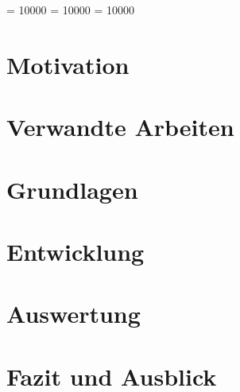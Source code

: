 \documentclass[12pt,a4paper,twosided,openany]{scrbook}
\begin{document}
\clubpenalty = 10000
\widowpenalty = 10000
\displaywidowpenalty = 10000

\mainmatter

\chapter{Motivation}
\label{cha:1_Motivation}

\chapter{Verwandte Arbeiten}

\chapter{Grundlagen}

\chapter{Entwicklung}
\label{cha:4_Entwicklung}

\chapter{Auswertung}

\chapter{Fazit und Ausblick}




\vfill
\pagebreak

\appendix

\end{document}
